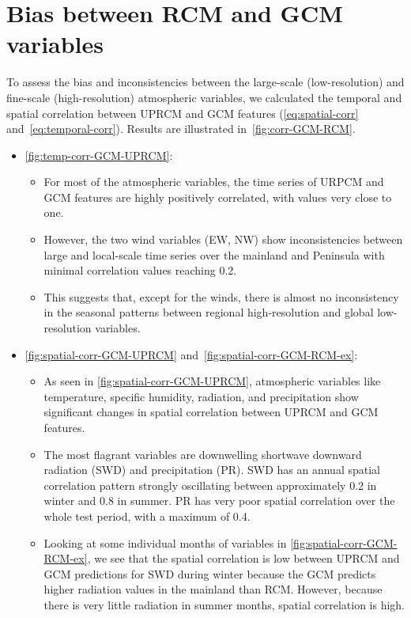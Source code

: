 \documentclass[a4paper,11pt,oneside]{report}
\begin{document}
\section{Bias between RCM and GCM variables}\label{sec:res-bias-RCM-GCM}
To assess the bias and inconsistencies between the large-scale (low-resolution) and fine-scale (high-resolution) atmospheric variables, we calculated the temporal and spatial correlation between UPRCM and GCM features (\autoref{eq:spatial-corr} and~\ref{eq:temporal-corr}). Results are illustrated in~\autoref{fig:corr-GCM-RCM}. 
\begin{itemize}
    \item \autoref{fig:temp-corr-GCM-UPRCM}: 
    \begin{itemize}
        \item For most of the atmospheric variables, the time series of URPCM and GCM features are highly positively correlated, with values very close to one.
        \item However, the two wind variables (EW, NW) show inconsistencies between large and local-scale time series over the mainland and Peninsula with minimal correlation values reaching 0.2.
        \item This suggests that, except for the winds, there is almost no inconsistency in the seasonal patterns between regional high-resolution and global low-resolution variables. 
    \end{itemize}
    \item \autoref{fig:spatial-corr-GCM-UPRCM} and~\ref{fig:spatial-corr-GCM-RCM-ex}: 
    \begin{itemize}
        \item As seen in \autoref{fig:spatial-corr-GCM-UPRCM}, atmospheric variables like temperature, specific humidity, radiation, and precipitation show significant changes in spatial correlation between UPRCM and GCM features.
        \item The most flagrant variables are downwelling shortwave downward radiation (SWD) and precipitation (PR). SWD has an annual spatial correlation pattern strongly oscillating between approximately 0.2 in winter and 0.8 in summer. PR has very poor spatial correlation over the whole test period, with a maximum of 0.4.
        \item Looking at some individual months of variables in \autoref{fig:spatial-corr-GCM-RCM-ex}, we see that the spatial correlation is low between UPRCM and GCM predictions for SWD during winter because the GCM predicts higher radiation values in the mainland than RCM. However, because there is very little radiation in summer months, spatial correlation is high. 

\end{itemize}
\end{itemize}
\end{document}
